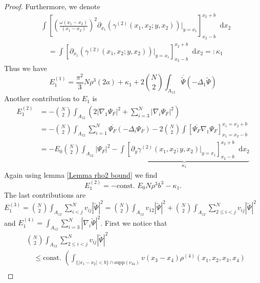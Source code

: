 \documentclass[a4paper,11pt]{article}
\newcommand{\supp}{\text{supp}}
\newcommand{\abs}[1]{\left\lvert #1 \right\rvert}
\newcommand*\diff{\mathop{}\!\mathrm{d}}
\numberwithin{equation}{section}
\begin{document}
\begin{proof}
		Furthermore, we denote \begin{equation}\label{EqGammaDeriv2.}
		\begin{aligned}
		&\int\left[\left(\frac{\omega(x_1-x_2)}{(x_1-x_2)}\right)^2\partial_{x_1}\left(\gamma^{(2)}(x_1,x_2;y,x_2)\right)\bigg\vert_{y=x_1}\right]_{x_2-b}^{x_2+b}\diff x_2\\
		&\quad=\int\left[\partial_{x_1}\left(\gamma^{(2)}(x_1,x_2;y,x_2)\right)\bigg\vert_{y=x_1}\right]_{x_2-b}^{x_2+b}\diff x_2=:\kappa_1
		\end{aligned}
		\end{equation}
		Thus we have \begin{equation}
		E_1^{(1)}=\frac{\pi^2}{3}N\rho^3 (2a)+\kappa_1+2\binom{N}{2}\int_{A_{12}}\overline{\tilde{\Psi}}(-\Delta_1\tilde{\Psi})
		\end{equation}
		Another contribution to $ E_1 $ is \begin{equation}
		\begin{aligned}
		E_1^{(2)}&=-\binom{N}{2}\int_{A_{12}}\left(2\abs{\nabla_1\Psi_F}^2+\sum_{i=3}^{N}\abs{\nabla_i\Psi_F}^2\right)\\&=-\binom{N}{2}\int_{A_{12}}\sum_{i=1}^{N}\overline{\Psi_F}(-\Delta_i\Psi_F)-2\binom{N}{2}\int\left[\overline{\Psi_F}\nabla_1\Psi_F\right]_{x_1=x_2-b}^{x_1=x_2+b}\\
		&=-E_0\binom{N}{2}\int_{A_{12}}\abs{\Psi_F}^2-\underbrace{\int\left[\partial_y\gamma^{(2)}(x_1,x_2;y,x_2)\vert_{y=x_1}\right]_{x_2-b}^{x_2+b} \diff x_2}_{\kappa_1}
		\end{aligned}
		\end{equation}
		Again using lemma \ref{Lemma rho2 bound} we find \begin{equation}
		E_1^{(2)}=-\text{const. }E_0 N\rho^3b^3-\kappa_1.
		\end{equation}
		The last contributions are $ E^{(3)}_1=\binom{N}{2}\int_{A_{12}} \sum_{i<j}^{N}v_{ij}\abs{\tilde{\Psi}}^2=\binom{N}{2}\int_{A_{12}}v_{12}\abs{\tilde{\Psi}}^2+\binom{N}{2}\int_{A_{12}} \sum_{2\leq i<j}^{N}v_{ij}\abs{\tilde{\Psi}}^2 $ and $ E_1^{(4)}=\int_{A_{12}}\sum_{i=3}^{N}\abs{\nabla_i\tilde{\Psi}}^2 $.
		First we notice that \begin{equation}
		\begin{aligned}
		&\binom{N}{2}\int_{A_{12}} \sum_{2\leq i<j}^{N}v_{ij}\abs{\tilde{\Psi}}^2\\&\quad\leq \text{const. } \left(\int_{\{\abs{x_1-x_2}<b\}\cap\supp(v_{34})}v(x_3-x_4)\rho^{(4)}(x_1,x_2,x_3,x_4)\right.\\

\end{aligned}
\end{equation}
\end{proof}
\end{document}
